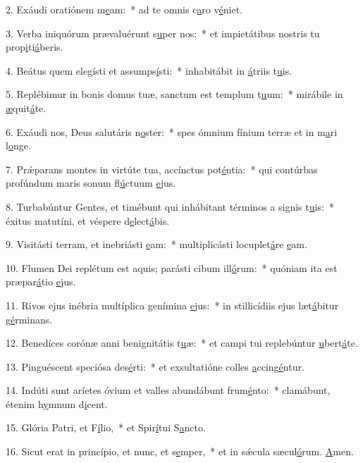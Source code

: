 2. Exáudi oratiónem m\uline{e}am:~* ad te omnis c\uline{a}ro v\uline{é}niet.\par 
3. Verba iniquórum prævaluérunt s\uline{u}per nos:~* et impietátibus nostris tu prop\uline{i}ti\uline{á}beris.\par 
4. Beátus quem elegísti et assumps\uline{í}sti:~* inhabitábit in \uline{á}triis t\uline{u}is.\par 
5. Replébimur in bonis domus tuæ, sanctum est templum t\uline{u}um:~* mirábile in \uline{æ}quit\uline{á}te.\par 
6. Exáudi nos, Deus salutáris n\uline{o}ster:~* spes ómnium fínium terræ et in m\uline{a}ri l\uline{o}nge.\par 
7. Prǽparans montes in virtúte tua, accínctus pot\uline{é}ntia:~* qui contúrbas profúndum maris sonum fl\uline{ú}ctuum \uline{e}jus.\par 
8. Turbabúntur Gentes, et timébunt qui inhábitant términos a signis t\uline{u}is:~* éxitus matutíni, et véspere d\uline{e}lect\uline{á}bis.\par 
9. Visitásti terram, et inebriásti \uline{e}am:~* multiplicásti locuplet\uline{á}re \uline{e}am.\par 
10. Flumen Dei replétum est aquis; parásti cibum ill\uline{ó}rum:~* quóniam ita est præpar\uline{á}tio \uline{e}jus.\par 
11. Rivos ejus inébria multíplica genímina \uline{e}jus:~* in stillicídiis ejus læt\uline{á}bitur g\uline{é}rminans.\par 
12. Benedíces corónæ anni benignitátis t\uline{u}æ:~* et campi tui replebúntur \uline{u}bert\uline{á}te.\par 
13. Pinguéscent speciósa des\uline{é}rti:~* et exsultatióne colles \uline{a}ccing\uline{é}ntur.\par 
14. Indúti sunt aríetes óvium et valles abundábunt frum\uline{é}nto:~* clamábunt, étenim h\uline{y}mnum d\uline{i}cent.\par 
15. Glória Patri, et F\uline{í}lio,~* et Spir\uline{í}tui S\uline{a}ncto.\par 
16. Sicut erat in princípio, et nunc, et s\uline{e}mper,~* et in sǽcula sæcul\uline{ó}rum. \uline{A}men.\par 
